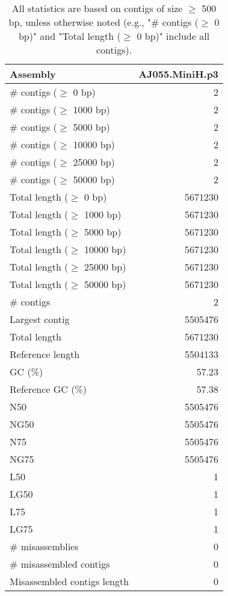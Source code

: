 \documentclass[12pt,a4paper]{article}
\begin{document}
\begin{table}[ht]
\begin{center}
\caption{All statistics are based on contigs of size $\geq$ 500 bp, unless otherwise noted (e.g., "\# contigs ($\geq$ 0 bp)" and "Total length ($\geq$ 0 bp)" include all contigs).}
\begin{tabular}{|l*{1}{|r}|}
\hline
Assembly & AJ055.MiniH.p3 \\ \hline
\# contigs ($\geq$ 0 bp) & 2 \\ \hline
\# contigs ($\geq$ 1000 bp) & 2 \\ \hline
\# contigs ($\geq$ 5000 bp) & 2 \\ \hline
\# contigs ($\geq$ 10000 bp) & 2 \\ \hline
\# contigs ($\geq$ 25000 bp) & 2 \\ \hline
\# contigs ($\geq$ 50000 bp) & 2 \\ \hline
Total length ($\geq$ 0 bp) & 5671230 \\ \hline
Total length ($\geq$ 1000 bp) & 5671230 \\ \hline
Total length ($\geq$ 5000 bp) & 5671230 \\ \hline
Total length ($\geq$ 10000 bp) & 5671230 \\ \hline
Total length ($\geq$ 25000 bp) & 5671230 \\ \hline
Total length ($\geq$ 50000 bp) & 5671230 \\ \hline
\# contigs & 2 \\ \hline
Largest contig & 5505476 \\ \hline
Total length & 5671230 \\ \hline
Reference length & 5504133 \\ \hline
GC (\%) & 57.23 \\ \hline
Reference GC (\%) & 57.38 \\ \hline
N50 & 5505476 \\ \hline
NG50 & 5505476 \\ \hline
N75 & 5505476 \\ \hline
NG75 & 5505476 \\ \hline
L50 & 1 \\ \hline
LG50 & 1 \\ \hline
L75 & 1 \\ \hline
LG75 & 1 \\ \hline
\# misassemblies & 0 \\ \hline
\# misassembled contigs & 0 \\ \hline
Misassembled contigs length & 0 \\ \hline

\end{tabular}
\end{center}
\end{table}
\end{document}
